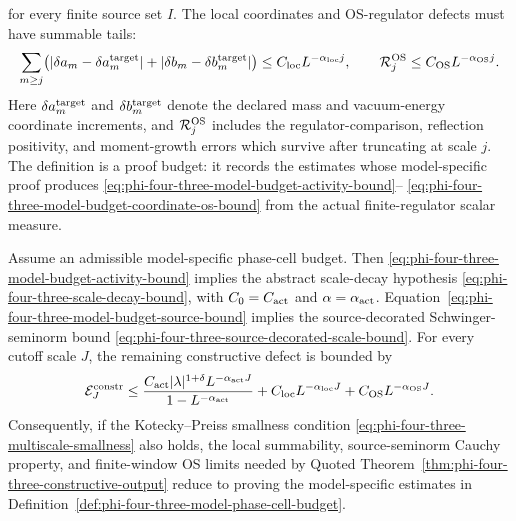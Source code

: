 \begin{definition}
for every finite source set \(I\).  The local coordinates and OS-regulator
defects must have summable tails:
\begin{equation}
  \sum_{m\geq j}
  \bigl(|\delta a_m-\delta a_m^{\rm target}|
        +|\delta b_m-\delta b_m^{\rm target}|\bigr)
  \leq
  C_{\rm loc}L^{-\alpha_{\rm loc}j},
  \qquad
  \mathcal R_j^{\rm OS}
  \leq
  C_{\rm OS}L^{-\alpha_{\rm OS}j}.
  \label{eq:phi-four-three-model-budget-coordinate-os-bound}
\end{equation}
Here \(\delta a_m^{\rm target}\) and \(\delta b_m^{\rm target}\) denote the
declared mass and vacuum-energy coordinate increments, and
\(\mathcal R_j^{\rm OS}\) includes the regulator-comparison, reflection
positivity, and moment-growth errors which survive after truncating at scale
\(j\).  The definition is a proof budget: it records the estimates whose
model-specific proof produces
\eqref{eq:phi-four-three-model-budget-activity-bound}--
\eqref{eq:phi-four-three-model-budget-coordinate-os-bound} from the actual
finite-regulator scalar measure.
\end{definition}

\begin{proposition}
\label{prop:phi-four-three-model-budget-suffices}
Assume an admissible model-specific phase-cell budget.  Then
\eqref{eq:phi-four-three-model-budget-activity-bound} implies the abstract
scale-decay hypothesis
\eqref{eq:phi-four-three-scale-decay-bound}, with
\(C_0=C_{\rm act}\) and \(\alpha=\alpha_{\rm act}\).
Equation~\eqref{eq:phi-four-three-model-budget-source-bound} implies the
source-decorated Schwinger-seminorm bound
\eqref{eq:phi-four-three-source-decorated-scale-bound}.  For every cutoff
scale \(J\), the remaining constructive defect is bounded by
\begin{equation}
  \mathcal E_J^{\rm constr}
  \leq
  \frac{C_{\rm act}|\lambda|^{1+\delta}L^{-\alpha_{\rm act}J}}
       {1-L^{-\alpha_{\rm act}}}
  +
  C_{\rm loc}L^{-\alpha_{\rm loc}J}
  +
  C_{\rm OS}L^{-\alpha_{\rm OS}J}.
  \label{eq:phi-four-three-model-budget-total-defect}
\end{equation}
Consequently, if the Kotecky--Preiss smallness condition
\eqref{eq:phi-four-three-multiscale-smallness} also holds, the local
summability, source-seminorm Cauchy property, and finite-window OS limits
needed by Quoted
Theorem~\ref{thm:phi-four-three-constructive-output} reduce to proving the
model-specific estimates in
Definition~\ref{def:phi-four-three-model-phase-cell-budget}.
\end{proposition}

